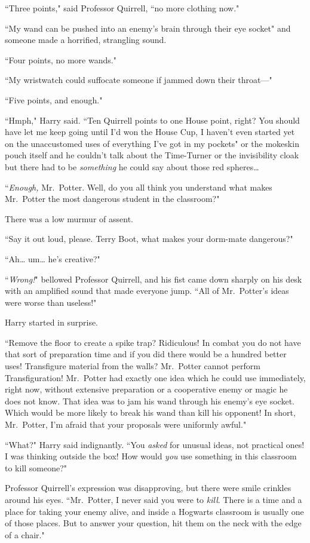 ``Three points," said Professor Quirrell, ``no more clothing now."

``My wand can be pushed into an enemy's brain through their eye socket" and someone made a horrified, strangling sound.

``Four points, no more wands."

``My wristwatch could suffocate someone if jammed down their throat—"

``Five points, and enough."

``Hmph," Harry said. ``Ten Quirrell points to one House point, right? You should have let me keep going until I'd won the House Cup, I haven't even started yet on the unaccustomed uses of everything I've got in my pockets" or the mokeskin pouch itself and he couldn't talk about the Time-Turner or the invisibility cloak but there had to be \emph{something} he could say about those red spheres{\ldots}

``\emph{Enough,} Mr.~Potter. Well, do you all think you understand what makes Mr.~Potter the most dangerous student in the classroom?"

There was a low murmur of assent.

``Say it out loud, please. Terry Boot, what makes your dorm-mate dangerous?"

``Ah{\ldots} um{\ldots} he's creative?"

``\emph{Wrong!}" bellowed Professor Quirrell, and his fist came down sharply on his desk with an amplified sound that made everyone jump. ``All of Mr.~Potter's ideas were worse than useless!"

Harry started in surprise.

``Remove the floor to create a spike trap? Ridiculous! In combat you do not have that sort of preparation time and if you did there would be a hundred better uses! Transfigure material from the walls? Mr.~Potter cannot perform Transfiguration! Mr.~Potter had exactly one idea which he could use immediately, right now, without extensive preparation or a cooperative enemy or magic he does not know. That idea was to jam his wand through his enemy's eye socket. Which would be more likely to break his wand than kill his opponent! In short, Mr.~Potter, I'm afraid that your proposals were uniformly awful."

``What?" Harry said indignantly. ``You \emph{asked} for unusual ideas, not practical ones! I was thinking outside the box! How would \emph{you} use something in this classroom to kill someone?"

Professor Quirrell's expression was disapproving, but there were smile crinkles around his eyes. ``Mr.~Potter, I never said you were to \emph{kill}. There is a time and a place for taking your enemy alive, and inside a Hogwarts classroom is usually one of those places. But to answer your question, hit them on the neck with the edge of a chair."

